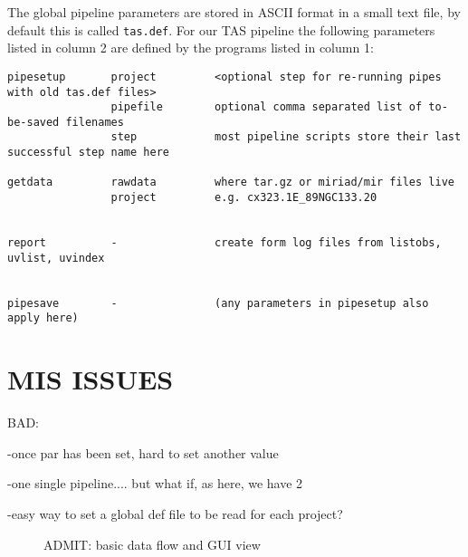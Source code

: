 \documentclass[preprint]{aastex} %
\begin{document}
The global pipeline parameters are stored in ASCII format in
a small text file, by default this is called {\tt tas.def}. 
For our TAS pipeline the following
parameters listed in column 2 are
defined by the programs listed in column 1:

\footnotesize
\begin{verbatim}
pipesetup       project         <optional step for re-running pipes with old tas.def files>
                pipefile        optional comma separated list of to-be-saved filenames
                step            most pipeline scripts store their last successful step name here

getdata         rawdata         where tar.gz or miriad/mir files live
                project         e.g. cx323.1E_89NGC133.20


report          -               create form log files from listobs, uvlist, uvindex


pipesave        -               (any parameters in pipesetup also apply here)

\end{verbatim}
\normalsize


\section{MIS ISSUES}

BAD:

-once par has been set, hard to set another value

-one single pipeline....  but what if, as here, we have 2

-easy way to set a global def file to be read for each project?


\begin{figure}[ht]
\caption{ADMIT: basic data flow and GUI view}
\label{fig:flow2}
\end{figure}
\end{document}

